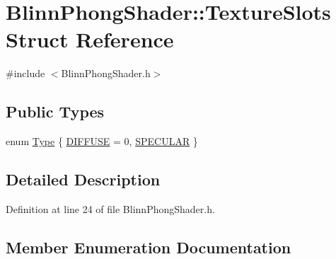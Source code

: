\hypertarget{struct_blinn_phong_shader_1_1_texture_slots}{}\section{Blinn\+Phong\+Shader\+:\+:Texture\+Slots Struct Reference}
\label{struct_blinn_phong_shader_1_1_texture_slots}


{\ttfamily \#include $<$Blinn\+Phong\+Shader.\+h$>$}

\subsection*{Public Types}
\begin{DoxyCompactItemize}
\item 
enum \hyperlink{struct_blinn_phong_shader_1_1_texture_slots_a98940b49ba855ee47d61a6243c05c34d}{Type} \{ \hyperlink{struct_blinn_phong_shader_1_1_texture_slots_a98940b49ba855ee47d61a6243c05c34da186e353d3c15d10c2020688e6d19f848}{D\+I\+F\+F\+U\+S\+E} = 0, 
\hyperlink{struct_blinn_phong_shader_1_1_texture_slots_a98940b49ba855ee47d61a6243c05c34daecb7e8082bc31bc5bb4318591411eb70}{S\+P\+E\+C\+U\+L\+A\+R}
 \}
\end{DoxyCompactItemize}


\subsection{Detailed Description}


Definition at line 24 of file Blinn\+Phong\+Shader.\+h.



\subsection{Member Enumeration Documentation}
\hypertarget{struct_blinn_phong_shader_1_1_texture_slots_a98940b49ba855ee47d61a6243c05c34d}{}
